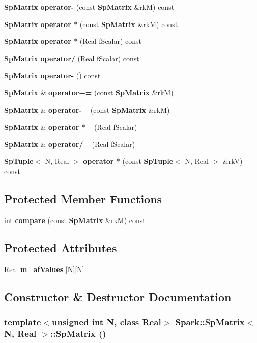 \begin{CompactItemize}
{\bf Sp\-Matrix} {\bf operator-} (const {\bf Sp\-Matrix} \&rk\-M) const
\item 
{\bf Sp\-Matrix} {\bf operator $\ast$} (const {\bf Sp\-Matrix} \&rk\-M) const
\item 
{\bf Sp\-Matrix} {\bf operator $\ast$} (Real f\-Scalar) const
\item 
{\bf Sp\-Matrix} {\bf operator/} (Real f\-Scalar) const
\item 
{\bf Sp\-Matrix} {\bf operator-} () const
\item 
{\bf Sp\-Matrix} \& {\bf operator+=} (const {\bf Sp\-Matrix} \&rk\-M)
\item 
{\bf Sp\-Matrix} \& {\bf operator-=} (const {\bf Sp\-Matrix} \&rk\-M)
\item 
{\bf Sp\-Matrix} \& {\bf operator $\ast$=} (Real f\-Scalar)
\item 
{\bf Sp\-Matrix} \& {\bf operator/=} (Real f\-Scalar)
\item 
{\bf Sp\-Tuple}$<$ N, Real $>$ {\bf operator $\ast$} (const {\bf Sp\-Tuple}$<$ N, Real $>$ \&rk\-V) const
\end{CompactItemize}
\subsection*{Protected Member Functions}
\begin{CompactItemize}
\item 
int {\bf compare} (const {\bf Sp\-Matrix} \&rk\-M) const
\end{CompactItemize}
\subsection*{Protected Attributes}
\begin{CompactItemize}
\item 
Real {\bf m\_\-af\-Values} [N][N]
\end{CompactItemize}


\subsection{Constructor \& Destructor Documentation}
\subsubsection{\setlength{\rightskip}{0pt plus 5cm}template$<$unsigned int N, class Real$>$ {\bf Spark::Sp\-Matrix}$<$ N, Real $>$::{\bf Sp\-Matrix} ()}\label{classSpark_1_1SpMatrix_a0}


